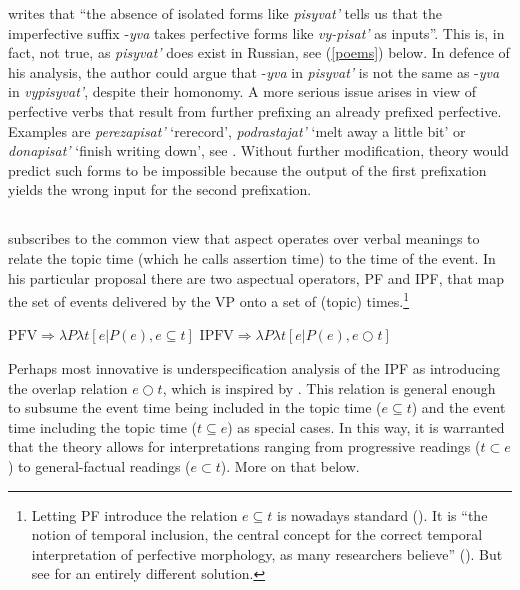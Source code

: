 \documentclass[output=paper,colorlinks,citecolor=brown]{langscibook}
\begin{document}
\noindent \citet[197]{Zucchi1999} writes that ``the absence of isolated forms like \textit{pisyvat'} tells us that the imperfective suffix -\textit{yva} takes perfective forms like \textit{vy-pisat'} as inputs''. This is, in fact, not true, as \textit{pisyvat'} does exist in Russian, see (\ref{poems}) below. In defence of his analysis, the author could argue that -\textit{yva} in \textit{pisyvat'} is not the same as  -\textit{yva} in \textit{vypisyvat'}, despite their homonomy. A more serious issue arises in view of perfective verbs that result from further prefixing an already prefixed perfective.
Examples are \textit{perezapisat'} `rerecord', \textit{podrastajat'} `melt away a little bit' or  \textit{donapisat'} `finish writing down', see \citet[52]{Tatevo13}. Without further modification,  theory would predict such forms to be impossible because the output of the first prefixation yields the wrong input for the second prefixation.    

\subsection{\citet{Gronn2004}}\label{gron} 
\citet{Gronn2004} subscribes to the common view that aspect operates over verbal meanings to relate the topic time (which he calls assertion time) to the time of the event. In his particular proposal there are two aspectual operators, PF and IPF, that map the set of events delivered by the VP onto a set of (topic) times.\footnote{Letting PF introduce the relation $ e\subseteq t$ is nowadays standard (\citealt{Klein1994}). It is ``the notion of temporal inclusion, the central concept for the correct temporal interpretation of perfective morphology, as many researchers believe'' (\citealt[314]{Paslawska.Stechow2003}). But see \citet{Borik2006} for an entirely different solution.}

\ea\label{gpairs}
\ea $\text{PFV} \Rightarrow \lambda P \lambda t [e | P(e), e \subseteq t ]$ \label{gpairsa}
\ex $\text{IPFV} \Rightarrow \lambda P \lambda t [e | P(e), e \bigcirc t ]$ \label{gpairsb}
\z\z

\noindent Perhaps most innovative is  underspecification analysis of the IPF as introducing the overlap relation $e \bigcirc t$, which is inspired by \citet{Klein1995}. This relation is general enough to subsume the event time being included in the topic time ($e\subseteq t$) and the event time including the topic time ($t\subseteq e$) as special cases. In this way, it is warranted that the theory allows for interpretations ranging from progressive readings ($t \subset e$) to general-factual readings ($e \subset t$). More on that below. 
\end{document}
